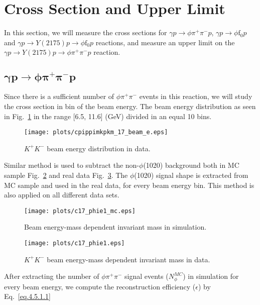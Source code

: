 \section{Cross Section and Upper Limit}
\label{p.4.5}

In this section, we will measure the cross sections for $\gamma p \rightarrow \phi \pi^+ \pi^- p$, $\gamma p \rightarrow \phi \mathrm{f}_0 p$ and $\gamma p \rightarrow Y(2175) p \rightarrow \phi \mathrm{f}_0 p$ reactions, and measure an upper limit on the $\gamma p \rightarrow Y(2175) p \rightarrow \phi \pi^+ \pi^- p$ reaction.

\subsection{\texorpdfstring{$\bm{\gamma p \rightarrow \phi \pi^{+} \pi^{-} p}$}{}}
\label{p.4.5.1}

Since there is a sufficient number of $\phi \pi^+ \pi^-$ events in this reaction, we will study the cross section in bin of the beam energy. The beam energy distribution as seen in Fig.~\ref{fig.4.5.1.1} in the range [6.5, 11.6] (GeV) divided in an equal 10 bins.

\begin{figure}[H]
    \centering
    \texttt{[image: plots/cpippimkpkm\_17\_beam\_e.eps]}
    \caption{\label{fig.4.5.1.1}$K^+ K^-$ beam energy distribution in data.}
\end{figure}

Similar method is used to subtract the non-$\phi$(1020) background both in MC sample Fig.~\ref{fig.4.5.1.2} and real data Fig.~\ref{fig.4.5.1.3}. The $\phi$(1020) signal shape is extracted from MC sample and used in the real data, for every beam energy bin. This method is also applied on all different data sets.

\begin{figure}[H]
    \centering
    \texttt{[image: plots/c17\_phie1\_mc.eps]}
    \caption{\label{fig.4.5.1.2}Beam energy-mass dependent invariant mass in simulation.}
\end{figure}

\begin{figure}[H]
    \centering
    \texttt{[image: plots/c17\_phie1.eps]}
    \caption{\label{fig.4.5.1.3}$K^+ K^-$ beam energy-mass dependent invariant mass in data.}
\end{figure}

After extracting the number of $\phi \pi^+ \pi^-$ signal events ($N_{\phi}^{MC}$) in simulation for every beam energy, we compute the reconstruction efficiency ($\epsilon$) by Eq.~\ref{eq.4.5.1.1}

